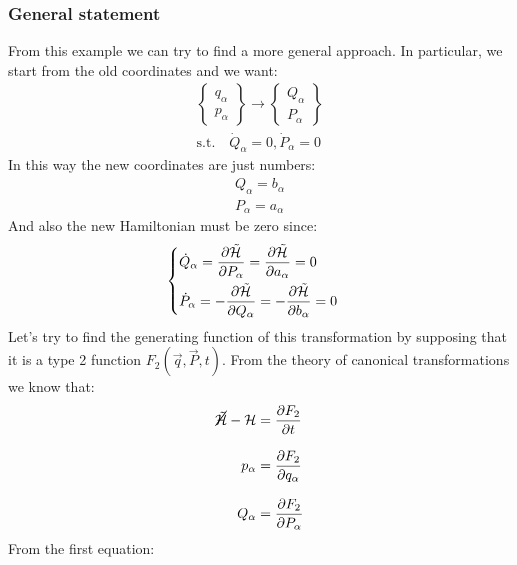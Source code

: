 \subsubsection{General statement}
From this example we can try to find a more general approach. In particular, we start from the old coordinates and we want:
\begin{equation}
  \begin{split}
    \begin{Bmatrix}
      q_{\alpha}\\
      p_{\alpha}
    \end{Bmatrix} \longrightarrow
    \begin{Bmatrix}
      Q_{\alpha}\\
      P_{\alpha}
    \end{Bmatrix}\\
    \text{s.t.} \quad \dot{Q}_{\alpha} = 0, \dot{P}_{\alpha} = 0
  \end{split}
\end{equation}
In this way the new coordinates are just numbers:
\begin{equation}
  \begin{split}
    Q_{\alpha} = b_{\alpha}\\
    P_{\alpha} = a_{\alpha}
  \end{split}
\end{equation}
And also the new Hamiltonian must be zero since:
\begin{equation}
  \begin{cases}
    \dot{Q}_{\alpha} = \pdv{\tilde{\hamfun}}{P_{\alpha}} = \pdv{\tilde{\hamfun}}{a_{\alpha}} = 0\\[8pt]
    \dot{P}_{\alpha} = -\pdv{\tilde{\hamfun}}{Q_{\alpha}} = -\pdv{\tilde{\hamfun}}{b_{\alpha}} = 0
  \end{cases}
\end{equation}
Let's try to find the generating function of this transformation by supposing that it is a type 2 function $F_2(\vec{q},\vec{P},t)$.
From the theory of canonical transformations we know that:
\begin{equation} \label{propertiesf2}
  \begin{split}
    \cancel{\tilde{\hamfun}} - \hamfun &= \pdv{F_2}{t}\\[8pt]
    p_{\alpha} &= \pdv{F_2}{q_{\alpha}}\\[8pt]
    Q_{\alpha} &= \pdv{F_2}{P_{\alpha}}
  \end{split}
\end{equation}
From the first equation:

